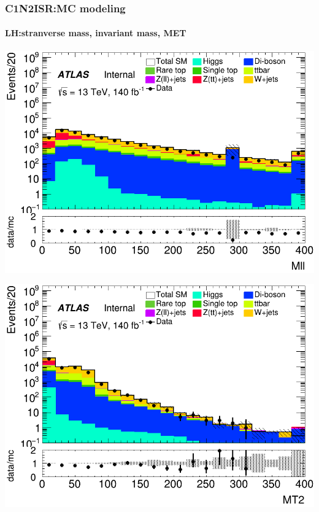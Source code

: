\documentclass[usenames,dvipsnames]{beamer}
\begin{document}
\begin{frame}
\frametitle{C1N2ISR:MC modeling}
\framesubtitle{LH:\quad stranverse mass, invariant mass, MET}
    \begin{minipage}{0.32\textwidth}
        \centering
        \includegraphics[width=\textwidth]{graphics/LH_met/LH_met_Mll.png}
    \end{minipage}
    \hfill
    \begin{minipage}{0.32\textwidth}
        \centering
        \includegraphics[width=\textwidth]{graphics/LH_met/LH_met_MT2.png}
    \end{minipage}
    \hfill
    

\end{frame}
\end{document}
